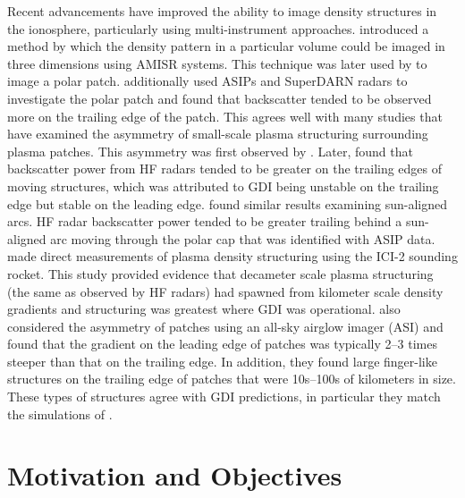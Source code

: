 Recent advancements have improved the ability to image density structures in the ionosphere, particularly using multi-instrument approaches.  \citet{Semeter2009} introduced a method by which the density pattern in a particular volume could be imaged in three dimensions using AMISR systems.  This technique was later used by \citet{Dahlgren2012a,Dahlgren2012b} to image a polar patch.  \citet{Dahlgren2012b} additionally used ASIPs and SuperDARN radars to investigate the polar patch and found that backscatter tended to be observed more on the trailing edge of the patch.  This agrees well with many studies that have examined the asymmetry of small-scale plasma structuring surrounding plasma patches.  This asymmetry was first observed by \citet{Weber1984}.  Later, \citet{Milan2002b} found that backscatter power from HF radars tended to be greater on the trailing edges of moving structures, which was attributed to GDI being unstable on the trailing edge but stable on the leading edge.  \citet{Koustov2012} found similar results examining sun-aligned arcs.  HF radar backscatter power tended to be greater trailing behind a sun-aligned arc moving through the polar cap that was identified with ASIP data.  \citet{Moen2012} made direct measurements of plasma density structuring using the ICI-2 sounding rocket.  This study provided evidence that decameter scale plasma structuring (the same as observed by HF radars) had spawned from kilometer scale density gradients and structuring was greatest where GDI was operational.  \citet{Hosokawa2016} also considered the asymmetry of patches using an all-sky airglow imager (ASI) and found that the gradient on the leading edge of patches was typically 2--3 times steeper than that on the trailing edge.  In addition, they found large finger-like structures on the trailing edge of patches that were 10s--100s of kilometers in size.  These types of structures agree with GDI predictions, in particular they match the simulations of \citet{Gondarenko2004}.



\section{Motivation and Objectives}

